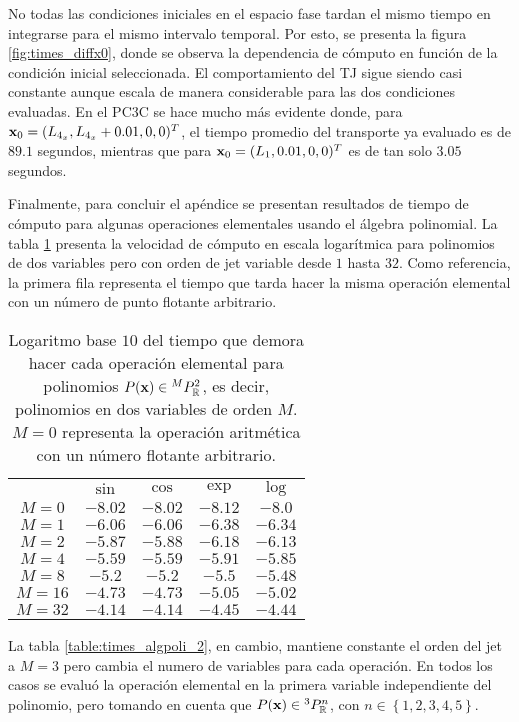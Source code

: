No todas las condiciones iniciales en el espacio fase tardan el mismo tiempo en integrarse para el mismo intervalo temporal. Por esto, se presenta la figura \ref{fig:times_diffx0}, donde se observa la dependencia de cómputo en función de la condición inicial seleccionada. El comportamiento del TJ sigue siendo casi constante aunque escala de manera considerable para las dos condiciones evaluadas. En el PC3C se hace mucho más evidente donde, para $\mathbf{x}_0 = (L_{4_x}, L_{4_x} + 0.01, 0, 0)^T$, el tiempo promedio del transporte ya evaluado es de $89.1$ segundos, mientras que para $\mathbf{x}_0 = (L_1, 0.01, 0, 0)^T$ es de tan solo $3.05$ segundos.

Finalmente, para concluir el apéndice se presentan resultados de tiempo de cómputo para algunas operaciones elementales usando el álgebra polinomial. La tabla \ref{table:times_algpoli_1} presenta la velocidad de cómputo en escala logarítmica para polinomios de dos variables pero con orden de jet variable desde $1$ hasta $32$. Como referencia, la primera fila representa el tiempo que tarda hacer la misma operación elemental con un número de punto flotante arbitrario. 

\begin{table}[h!]
\centering
\begin{tabular}{c|cccc}
\toprule
     & \textbf{$\sin$} & \textbf{$\cos$} & \textbf{$\exp$} & \textbf{$\log$} \\ \cmidrule(l){1-5} 
$M=0$  & $-8.02$ & $-8.02$ & $-8.12$ & $-8.0 $ \\
$M=1$  & $-6.06$ & $-6.06$ & $-6.38$ & $-6.34$ \\
$M=2$  & $-5.87$ & $-5.88$ & $-6.18$ & $-6.13$ \\
$M=4$  & $-5.59$ & $-5.59$ & $-5.91$ & $-5.85$ \\
$M=8$  & $-5.2 $ & $-5.2 $ & $-5.5 $ & $-5.48$ \\
$M=16$ & $-4.73$ & $-4.73$ & $-5.05$ & $-5.02$ \\
$M=32$ & $-4.14$ & $-4.14$ & $-4.45$ & $-4.44$ \\ \bottomrule 
\end{tabular}
\caption{Logaritmo base $10$ del tiempo que demora hacer cada operación elemental para polinomios $P(\mathbf{x}) \in {^{M}P_{\mathbb{R}}^ 2 }$, es decir, polinomios en dos variables de orden $M$. $M=0$ representa la operación aritmética con un número flotante arbitrario.}
\label{table:times_algpoli_1}
\end{table}

La tabla \ref{table:times_algpoli_2}, en cambio, mantiene constante el orden del jet a $M=3$ pero cambia el numero de variables para cada operación. En todos los casos se evaluó la operación elemental en la primera variable independiente del polinomio, pero tomando en cuenta que $P(\mathbf{x}) \in {^{3}P_{\mathbb{R}}^ n }$, con $n \in \left\lbrace 1,2,3,4,5 \right\rbrace$. 

